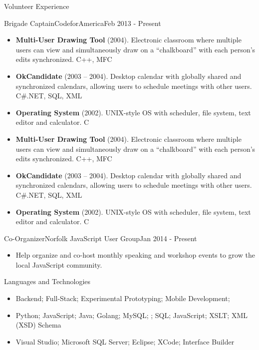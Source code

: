 \documentclass[]{mcdowellcv}
\begin{document}
	\begin{cvsection}{Volunteer Experience}
		\begin{cvsubsection}{Brigade Captain}{CodeforAmerica}{Feb 2013 - Present}
			\begin{itemize}
				\item \textbf{Multi-User Drawing Tool} (2004). Electronic classroom where multiple users can view and simultaneously draw on a “chalkboard” with each person’s edits synchronized.  C++, MFC
				\item \textbf{OkCandidate} (2003 – 2004). Desktop calendar with globally shared and synchronized calendars, allowing users to schedule meetings with other users.  C\#.NET, SQL, XML
				\item \textbf{Operating System} (2002).  UNIX-style OS with scheduler, file system, text editor and calculator. C
			\end{itemize}

			\begin{itemize}
				\item \textbf{Multi-User Drawing Tool} (2004). Electronic classroom where multiple users can view and simultaneously draw on a “chalkboard” with each person’s edits synchronized.  C++, MFC
				\item \textbf{OkCandidate} (2003 – 2004). Desktop calendar with globally shared and synchronized calendars, allowing users to schedule meetings with other users.  C\#.NET, SQL, XML
				\item \textbf{Operating System} (2002).  UNIX-style OS with scheduler, file system, text editor and calculator. C
			\end{itemize}

		\end{cvsubsection}

		\begin{cvsubsection}{Co-Organizer}{Norfolk JavaScript User Group}{Jan 2014 - Present}
			\begin{itemize}
				\item Help organize and co-host monthly speaking and workshop events to grow the local JavaScript community.
			\end{itemize}
		\end{cvsubsection}

	\end{cvsection}

	\begin{cvsection}{Languages and Technologies}
		\begin{cvsubsection}{}{}{}
			\begin{itemize}
				\item Backend; Full-Stack; Experimental Prototyping; Mobile Development;
				\item Python; JavaScript; Java; Golang; MySQL; ; SQL; JavaScript; XSLT; XML (XSD) Schema
				\item Visual Studio; Microsoft SQL Server; Eclipse; XCode; Interface Builder
			\end{itemize}
		\end{cvsubsection}
	\end{cvsection}
\end{document}
